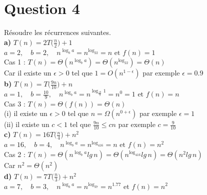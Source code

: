 \documentclass[12pt]{article}
\begin{document}
\newpage

\section*{Question 4}
Résoudre les récurrences suivantes. \\

\textbf{a) } \(T(n)=2T\big(\frac{n}{2}\big)+1\) \\

\(a=2, \quad b=2, \quad n^{\log_ba} = n^{\log_22}=n \text{ et } f(n) = 1\) \\

Cas 1 : \(T(n) = \Theta(n^{\log_ba}) = \Theta(n^{\log_22}) = \Theta(n) \) \\

Car il existe un \(\epsilon>0\) tel que \(1 = O(n^{1-\epsilon}) \) par exemple \(\epsilon=0.9\) \\

\textbf{b) } \(T(n)=T\big(\frac{9n}{10}\big)+n\) \\

\(a=1, \quad b=\frac{10}{9}, \quad n^{\log_ba} = n^{\log_{\frac{10}{9}}1}=n^0=1 \text{ et } f(n) = n\) \\

Cas 3 : \(T(n)=\Theta(f(n))= \Theta(n) \) \\

(i) il existe un \(\epsilon>0\) tel que \(n = \Omega(n^{0+\epsilon}) \) par exemple \(\epsilon=1\) \\
(ii) il existe un \(c < 1\) tel que \( \frac{9n}{10} \leq cn \) par exemple \(c=\frac{9}{10}\) \\

\textbf{c) } \(T(n)=16T\big(\frac{n}{4}\big)+n^2\) \\

\(a=16, \quad b=4, \quad n^{\log_ba} = n^{\log_416}=n \text{ et } f(n) = n^2\) \\

Cas 2 : \(T(n) = \Theta(n^{\log_ba}lg \, n) = \Theta(n^{\log_416}lg \, n) = \Theta(n^2lg \, n) \) \\

Car \(n^2 = \Theta(n^2) \) \\

\textbf{d) } \(T(n)=7T\big(\frac{n}{3}\big)+n^2\) \\

\(a=7, \quad b=3, \quad n^{\log_ba} = n^{\log_37}=n^{1.77} \text{ et } f(n) = n^2\) \\
\end{document}
